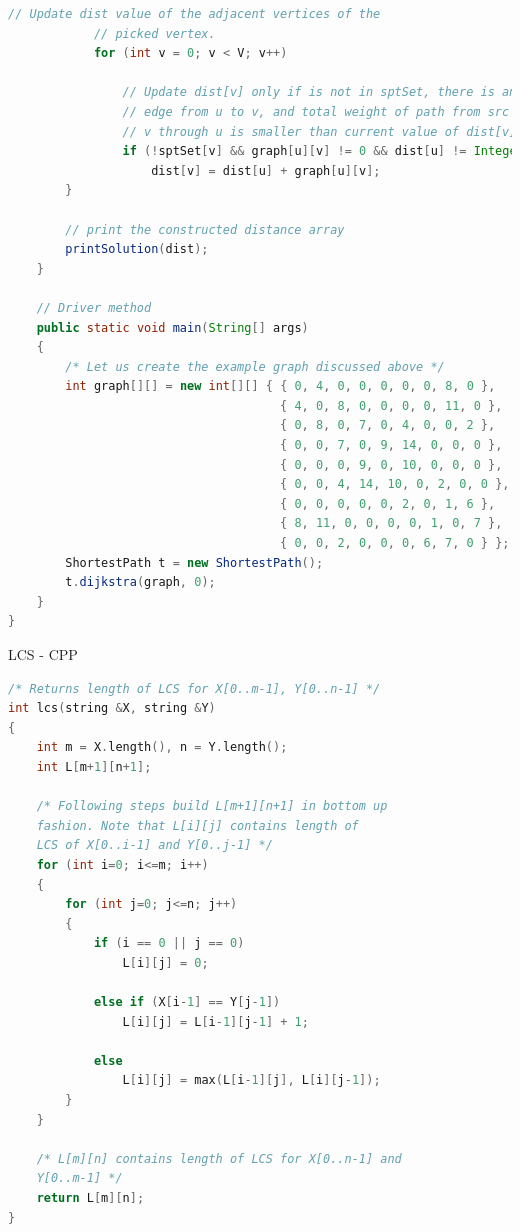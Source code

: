 \documentclass[11pt]{scrartcl}
\begin{document}
\begin{lstlisting}[language = java]
            // Update dist value of the adjacent vertices of the
            // picked vertex.
            for (int v = 0; v < V; v++)
 
                // Update dist[v] only if is not in sptSet, there is an
                // edge from u to v, and total weight of path from src to
                // v through u is smaller than current value of dist[v]
                if (!sptSet[v] && graph[u][v] != 0 && dist[u] != Integer.MAX_VALUE && dist[u] + graph[u][v] < dist[v])
                    dist[v] = dist[u] + graph[u][v];
        }
 
        // print the constructed distance array
        printSolution(dist);
    }
 
    // Driver method
    public static void main(String[] args)
    {
        /* Let us create the example graph discussed above */
        int graph[][] = new int[][] { { 0, 4, 0, 0, 0, 0, 0, 8, 0 },
                                      { 4, 0, 8, 0, 0, 0, 0, 11, 0 },
                                      { 0, 8, 0, 7, 0, 4, 0, 0, 2 },
                                      { 0, 0, 7, 0, 9, 14, 0, 0, 0 },
                                      { 0, 0, 0, 9, 0, 10, 0, 0, 0 },
                                      { 0, 0, 4, 14, 10, 0, 2, 0, 0 },
                                      { 0, 0, 0, 0, 0, 2, 0, 1, 6 },
                                      { 8, 11, 0, 0, 0, 0, 1, 0, 7 },
                                      { 0, 0, 2, 0, 0, 0, 6, 7, 0 } };
        ShortestPath t = new ShortestPath();
        t.dijkstra(graph, 0);
    }
}
\end{lstlisting}

\vspace{5mm}
LCS - CPP

\begin{lstlisting}[language = C++]
    /* Returns length of LCS for X[0..m-1], Y[0..n-1] */
int lcs(string &X, string &Y)
{
	int m = X.length(), n = Y.length();
	int L[m+1][n+1];

	/* Following steps build L[m+1][n+1] in bottom up
	fashion. Note that L[i][j] contains length of
	LCS of X[0..i-1] and Y[0..j-1] */
	for (int i=0; i<=m; i++)
	{
		for (int j=0; j<=n; j++)
		{
			if (i == 0 || j == 0)
				L[i][j] = 0;

			else if (X[i-1] == Y[j-1])
				L[i][j] = L[i-1][j-1] + 1;

			else
				L[i][j] = max(L[i-1][j], L[i][j-1]);
		}
	}

	/* L[m][n] contains length of LCS for X[0..n-1] and
	Y[0..m-1] */
	return L[m][n];
}

\end{lstlisting}
\end{document}
